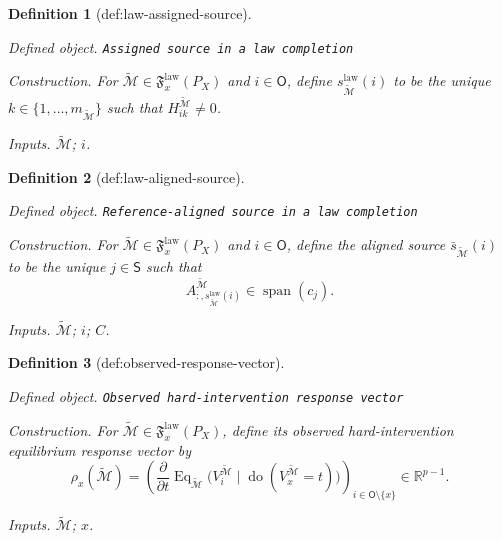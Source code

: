 \documentclass{article}
\newtheorem{definition}{Definition}
\begin{document}
\begin{definition}[def:law-assigned-source]\label{def:law-assigned-source}
\par\smallskip\noindent\emph{Defined object.} \texttt{Assigned source in a law completion}
\par\smallskip\noindent\emph{Construction.} For \(\widetilde{\mathcal M}\in\mathfrak F_x^{\mathrm{law}}(P_X)\) and \(i\in\mathsf O\), define \(s_{\widetilde{\mathcal M}}^{\mathrm{law}}(i)\) to be the unique \(k\in\{1,\ldots,m_{\widetilde{\mathcal M}}\}\) such that \(H^{\widetilde{\mathcal M}}_{ik}\ne0\).
\par\smallskip\noindent\emph{Inputs.} \(\widetilde{\mathcal M}\); \(i\).
\end{definition}

\begin{definition}[def:law-aligned-source]\label{def:law-aligned-source}
\par\smallskip\noindent\emph{Defined object.} \texttt{Reference-\allowbreak{}aligned source in a law completion}
\par\smallskip\noindent\emph{Construction.} For \(\widetilde{\mathcal M}\in\mathfrak F_x^{\mathrm{law}}(P_X)\) and \(i\in\mathsf O\), define the aligned source \(\bar s_{\widetilde{\mathcal M}}(i)\) to be the unique \(j\in\mathsf S\) such that
\[
 A^{\widetilde{\mathcal M}}_{:,s_{\widetilde{\mathcal M}}^{\mathrm{law}}(i)}
 \in\operatorname{span}(c_j).
\]
\par\smallskip\noindent\emph{Inputs.} \(\widetilde{\mathcal M}\); \(i\); \(C\).
\end{definition}

\begin{definition}[def:observed-response-vector]\label{def:observed-response-vector}
\par\smallskip\noindent\emph{Defined object.} \texttt{Observed hard-\allowbreak{}intervention response vector}
\par\smallskip\noindent\emph{Construction.} For \(\widetilde{\mathcal M}\in\mathfrak F_x^{\mathrm{law}}(P_X)\), define its observed hard-intervention equilibrium response vector by
\[
 \rho_x(\widetilde{\mathcal M})
 =\left(
 \frac{\partial}{\partial t}\operatorname{Eq}_{\widetilde{\mathcal M}}
 \bigl(V_i^{\widetilde{\mathcal M}}\mid\operatorname{do}(V_x^{\widetilde{\mathcal M}}=t)\bigr)
 \right)_{i\in\mathsf O\setminus\{x\}}
 \in\mathbb R^{p-1}.
\]
\par\smallskip\noindent\emph{Inputs.} \(\widetilde{\mathcal M}\); \(x\).
\end{definition}
\end{document}
